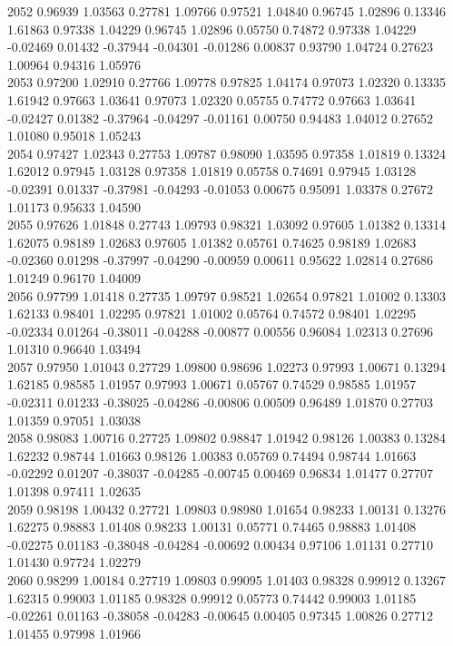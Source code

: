 {2052 0.96939 1.03563 0.27781 1.09766 0.97521 1.04840 0.96745 1.02896 0.13346 1.61863 0.97338 1.04229 0.96745 1.02896 0.05750 0.74872 0.97338 1.04229 -0.02469 0.01432 -0.37944 -0.04301 -0.01286 0.00837 0.93790 1.04724 0.27623 1.00964 0.94316 1.05976 \\
2053 0.97200 1.02910 0.27766 1.09778 0.97825 1.04174 0.97073 1.02320 0.13335 1.61942 0.97663 1.03641 0.97073 1.02320 0.05755 0.74772 0.97663 1.03641 -0.02427 0.01382 -0.37964 -0.04297 -0.01161 0.00750 0.94483 1.04012 0.27652 1.01080 0.95018 1.05243 \\
2054 0.97427 1.02343 0.27753 1.09787 0.98090 1.03595 0.97358 1.01819 0.13324 1.62012 0.97945 1.03128 0.97358 1.01819 0.05758 0.74691 0.97945 1.03128 -0.02391 0.01337 -0.37981 -0.04293 -0.01053 0.00675 0.95091 1.03378 0.27672 1.01173 0.95633 1.04590 \\
2055 0.97626 1.01848 0.27743 1.09793 0.98321 1.03092 0.97605 1.01382 0.13314 1.62075 0.98189 1.02683 0.97605 1.01382 0.05761 0.74625 0.98189 1.02683 -0.02360 0.01298 -0.37997 -0.04290 -0.00959 0.00611 0.95622 1.02814 0.27686 1.01249 0.96170 1.04009 \\
2056 0.97799 1.01418 0.27735 1.09797 0.98521 1.02654 0.97821 1.01002 0.13303 1.62133 0.98401 1.02295 0.97821 1.01002 0.05764 0.74572 0.98401 1.02295 -0.02334 0.01264 -0.38011 -0.04288 -0.00877 0.00556 0.96084 1.02313 0.27696 1.01310 0.96640 1.03494 \\
2057 0.97950 1.01043 0.27729 1.09800 0.98696 1.02273 0.97993 1.00671 0.13294 1.62185 0.98585 1.01957 0.97993 1.00671 0.05767 0.74529 0.98585 1.01957 -0.02311 0.01233 -0.38025 -0.04286 -0.00806 0.00509 0.96489 1.01870 0.27703 1.01359 0.97051 1.03038 \\
2058 0.98083 1.00716 0.27725 1.09802 0.98847 1.01942 0.98126 1.00383 0.13284 1.62232 0.98744 1.01663 0.98126 1.00383 0.05769 0.74494 0.98744 1.01663 -0.02292 0.01207 -0.38037 -0.04285 -0.00745 0.00469 0.96834 1.01477 0.27707 1.01398 0.97411 1.02635 \\
2059 0.98198 1.00432 0.27721 1.09803 0.98980 1.01654 0.98233 1.00131 0.13276 1.62275 0.98883 1.01408 0.98233 1.00131 0.05771 0.74465 0.98883 1.01408 -0.02275 0.01183 -0.38048 -0.04284 -0.00692 0.00434 0.97106 1.01131 0.27710 1.01430 0.97724 1.02279 \\
2060 0.98299 1.00184 0.27719 1.09803 0.99095 1.01403 0.98328 0.99912 0.13267 1.62315 0.99003 1.01185 0.98328 0.99912 0.05773 0.74442 0.99003 1.01185 -0.02261 0.01163 -0.38058 -0.04283 -0.00645 0.00405 0.97345 1.00826 0.27712 1.01455 0.97998 1.01966 \\
}
